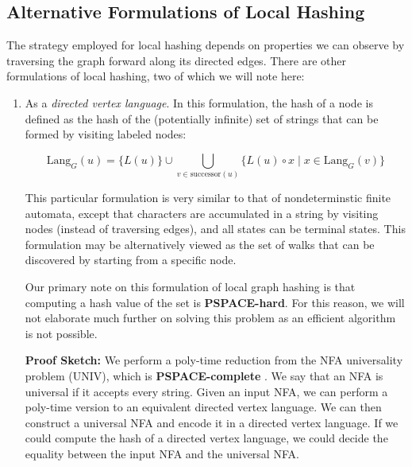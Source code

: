 \documentclass[twoside,leqno]{article}
\begin{document}

\subsection{Alternative Formulations of Local Hashing}

The strategy employed for local hashing depends on properties we can observe by traversing the graph forward along its directed edges. There are other formulations of local hashing, two of which we will note here:

\begin{enumerate}
  \item As a \textit{directed vertex language}. In this formulation, the hash of a node is defined as the hash of the (potentially infinite) set of strings that can be formed by visiting labeled nodes:
  
  \begin{equation}
  \text{Lang}_G(u) = \{L(u)\} \cup \bigcup_{v \in \text{successor}(u)} \{L(u) \circ x \mid x \in \text{Lang}_G(v)\}
  \end{equation}

  This particular formulation is very similar to that of nondeterminstic finite automata, except that characters are accumulated in a string by visiting nodes (instead of traversing edges), and all states can be terminal states. This formulation may be alternatively viewed as the set of walks that can be discovered by starting from a specific node.

  Our primary note on this formulation of local graph hashing is that computing a hash value of the set is \textbf{PSPACE-hard}. For this reason, we will not elaborate much further on solving this problem as an efficient algorithm is not possible.

  \textbf{Proof Sketch:} We perform a poly-time reduction from the NFA universality problem (UNIV), which is \textbf{PSPACE-complete} \cite{univ}. We say that an NFA is universal if it accepts every string. Given an input NFA, we can perform a poly-time version to an equivalent directed vertex language. We can then construct a universal NFA and encode it in a directed vertex language. If we could compute the hash of a directed vertex language, we could decide the equality between the input NFA and the universal NFA.


\end{enumerate}
\end{document}
